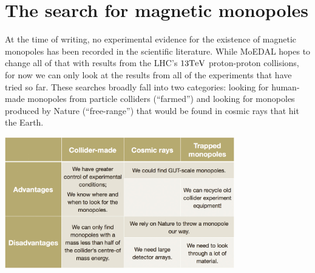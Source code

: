 \section{The search for magnetic monopoles}
\label{sec:search}
At the time of writing,
no experimental evidence for the existence of magnetic monopoles has been
recorded in the scientific literature.
While \ac{MoEDAL} hopes to change all of that with results from the \ac{LHC}'s
$13 \textrm{T} \textrm{e\ensuremath{\textrm{V}}}$ proton-proton collisions, for now we can only look at the results
from all of the experiments that have tried so far.
These searches broadly fall into two categories:
looking for human-made monopoles from particle colliders (``farmed'')
and
looking for monopoles produced by Nature (``free-range'')
that would be found in cosmic rays that hit the Earth.

%
\begin{table}[htbp]
  \centering
  \includegraphics[width=0.75\textwidth]{assets/images/search-table/search-table.jpg}
  \caption[Monopole search strategies]
  {\label{tab:searchstrategies}The advantages and disadvantages of the different search %
strategies employed to find experimental evidence for magnetic monopoles.}
\end{table}
%

